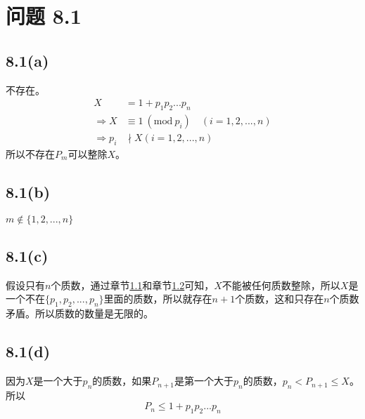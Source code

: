 \documentclass[acmlarge,screen]{acmart}
\begin{document}
\section{问题 8.1}
\subsection{8.1(a)}
\label{8.1(a)}
不存在。
\begin{align*}
	X &= 1+p_1p_2...p_n\\
	\Rightarrow X &\equiv 1\ (\text{mod}\ p_i)\quad(i=1,2,...,n)\\
	\Rightarrow p_i&\nmid X (i=1,2,...,n)
\end{align*}
所以不存在$P_m$可以整除$X$。
\subsection{8.1(b)}
\label{8.1(b)}
$m\notin \{1, 2, ..., n\}$
\subsection{8.1(c)}
假设只有$n$个质数，通过章节\ref{8.1(a)}和章节\ref{8.1(b)}可知，$X$不能被任何质数整除，所以$X$是一个不在$\{p_1,p_2,...,p_n\}$里面的质数，所以就存在$n+1$个质数，这和只存在$n$个质数矛盾。所以质数的数量是无限的。
\subsection{8.1(d)}
因为$X$是一个大于$p_n$的质数，如果$P_{n+1}$是第一个大于$p_n$的质数，$p_n<P_{n+1} \leq X$。所以
\begin{displaymath}
	P_n\leq 1+p_1p_2...p_n
\end{displaymath}
\end{document}
